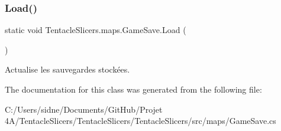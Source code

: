 \subsubsection{\texorpdfstring{Load()}{Load()}}
{\footnotesize\ttfamily static void Tentacle\+Slicers.\+maps.\+Game\+Save.\+Load (\begin{DoxyParamCaption}{ }\end{DoxyParamCaption})\hspace{0.3cm}{\ttfamily [static]}}



Actualise les sauvegardes stockées. 



The documentation for this class was generated from the following file\+:\begin{DoxyCompactItemize}
\item 
C\+:/\+Users/sidne/\+Documents/\+Git\+Hub/\+Projet 4\+A/\+Tentacle\+Slicers/\+Tentacle\+Slicers/\+Tentacle\+Slicers/src/maps/Game\+Save.\+cs\end{DoxyCompactItemize}

